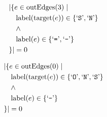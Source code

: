 \begin{align*}
&|\{e \in \mathrm{outEdges}(3)  \mid \\
&\quad \mathrm{label}(\mathrm{target}(e)) \in \{ \text{`\texttt{S}'},  \text{`\texttt{N}'} \}\\
&\quad \wedge\\
&\quad \mathrm{label}(e) \in \{ \text{`\texttt{=}'},  \text{`\texttt{-}'} \}\\
&\}| = 0
\end{align*}

\begin{align*}
&|\{e \in \mathrm{outEdges}(0)  \mid \\
&\quad \mathrm{label}(\mathrm{target}(e)) \in \{ \text{`\texttt{O}'},  \text{`\texttt{N}'},  \text{`\texttt{S}'} \}\\
&\quad \wedge\\
&\quad \mathrm{label}(e) \in \{ \text{`\texttt{-}'} \}\\
&\}| = 0
\end{align*}

